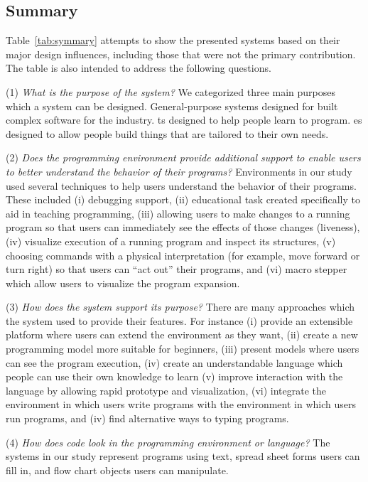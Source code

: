 \subsection{Summary}

Table~\ref{tab:symmary} attempts to show the presented systems based on their major design influences, including those that were not the primary contribution. The table is also intended to address the following questions.

(1) \textit{What is the purpose of the system?} We categorized three main purposes which a system can be designed. General-purpose systems designed for built complex software for the industry. \ac{ts} designed to help people learn to program. \ac{es} designed to allow people build things that are tailored to their own needs.

(2) \textit{Does the programming environment provide additional support to enable users to better understand the behavior of their programs?} Environments in our study used several techniques to help users understand the behavior of their programs. These included (i) debugging support, (ii) educational task created specifically to aid in teaching programming, (iii) allowing users to make changes to a running program so that users can immediately see the effects of those changes (liveness), (iv) visualize execution of a running program and inspect its structures, (v) choosing commands with a physical interpretation (for example, move forward or turn right) so that users can “act out” their programs, and (vi) macro stepper which allow users to visualize the program expansion.

(3) \textit{How does the system support its purpose?} There are many approaches which the system used to provide their features. For instance (i) provide an extensible platform where users can extend the environment as they want, (ii) create a new programming model more suitable for beginners, (iii) present models where users can see the program execution, (iv) create an understandable language which people can use their own knowledge to learn (v) improve interaction with the language by allowing rapid prototype and visualization, (vi) integrate the environment in which users write programs with the environment in which users run programs, and (iv) find alternative ways to typing programs.

(4) \textit{How does code look in the programming environment or language?} The systems in our study represent programs using text, spread sheet forms users can fill in, and flow chart objects users can manipulate.

